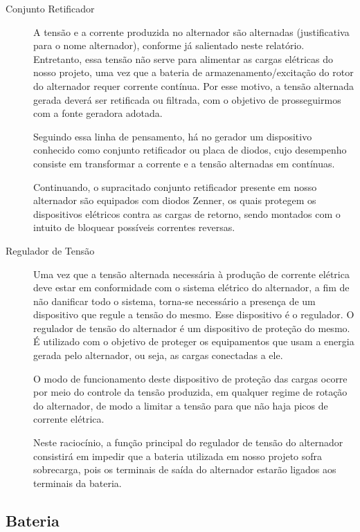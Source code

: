 \begin{description}
\item [Conjunto Retificador]

A tensão e a corrente produzida no alternador são alternadas (justificativa para o nome alternador), conforme já salientado neste relatório. Entretanto, essa tensão não serve para alimentar as cargas elétricas do nosso projeto, uma vez que a bateria de armazenamento/excitação do rotor do alternador requer corrente contínua. Por esse motivo, a tensão alternada gerada deverá ser retificada ou filtrada, com o objetivo de prosseguirmos com a fonte geradora adotada.

Seguindo essa linha de pensamento, há no gerador um dispositivo conhecido como conjunto retificador ou placa de diodos, cujo desempenho consiste em transformar a corrente e a tensão alternadas em contínuas.

Continuando, o supracitado conjunto retificador presente em nosso alternador são equipados com diodos Zenner, os quais protegem os dispositivos elétricos contra as cargas de retorno, sendo montados com o intuito de bloquear possíveis correntes reversas.


\item [Regulador de Tensão]

Uma vez que a tensão alternada necessária à produção de corrente elétrica deve estar em conformidade com o sistema elétrico do alternador, a fim de não danificar todo o sistema, torna-se necessário a presença de um dispositivo que regule a tensão do mesmo. Esse dispositivo é o regulador.
O regulador de tensão do alternador é um dispositivo de proteção do mesmo. É utilizado com o objetivo de proteger os equipamentos que usam a energia gerada pelo alternador, ou seja, as cargas conectadas a ele. 

O modo de funcionamento deste dispositivo de proteção das cargas ocorre por meio do controle da tensão produzida, em qualquer regime de rotação do alternador, de modo a limitar a tensão para que não haja picos de corrente elétrica.

Neste raciocínio, a função principal do regulador de tensão do alternador consistirá em impedir que a bateria utilizada em nosso projeto sofra sobrecarga, pois os terminais de saída do alternador estarão ligados aos terminais da bateria.
\end{description}

\subsection{Bateria}


